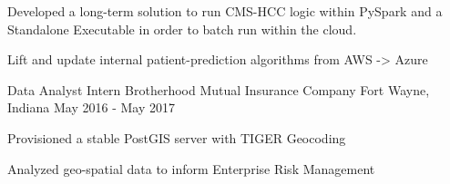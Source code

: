 \begin{cventries}
{\begin{cvsubentries}
{\begin{cvitems}
	       \item {Developed a long-term solution to run CMS-HCC logic within PySpark and a Standalone Executable in order to batch run within the cloud.}
	       \item {Lift and update internal patient-prediction algorithms from AWS -> Azure}
             \end{cvitems}
           }
      \end{cvsubentries}
    }
%

  \cventry
    {Data Analyst Intern} %
    {Brotherhood Mutual Insurance Company} %
    {Fort Wayne, Indiana} %
    {May 2016 - May 2017} %
    {
      \begin{cvitems} %
        \item {Provisioned a stable PostGIS server with TIGER Geocoding}
        \item {Analyzed geo-spatial data to inform Enterprise Risk Management}
      \end{cvitems}
    }


\end{cventries}
